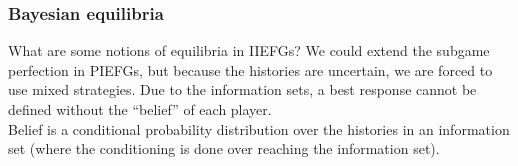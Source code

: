 	\subsubsection{Bayesian equilibria}

		
		What are some notions of equilibria in IIEFGs? We could extend the subgame perfection in PIEFGs, but because the histories are uncertain, we are forced to use mixed strategies. Due to the information sets, a best response cannot be defined without the ``belief'' of each player.\\
		Belief is a conditional probability distribution over the histories in an information set (where the conditioning is done over reaching the information set).

